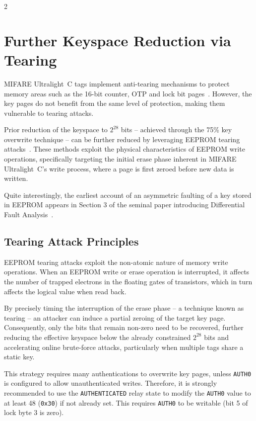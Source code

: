 \documentclass[10pt,letterpaper]{article}
\begin{document}
\begin{multicols}{2}
\section{Further Keyspace Reduction via Tearing}
\label{sec:tear}

MIFARE Ultralight~C tags implement anti-tearing mechanisms to protect memory areas such as the 16-bit counter, OTP and lock bit pages~\cite{nxp_an12265}. However, the key pages do not benefit from the same level of protection, making them vulnerable to tearing attacks.

Prior reduction of the keyspace to $2^{28}$ bits -- achieved through the 75\% key overwrite technique -- can be further reduced by leveraging EEPROM tearing attacks~\cite{teuwen2021eeprom}. These methods exploit the physical characteristics of EEPROM write operations, specifically targeting the initial erase phase inherent in MIFARE Ultralight~C's write process, where a page is first zeroed before new data is written.

Quite interestingly, the earliest account of an asymmetric faulting of a key stored in EEPROM appears in Section 3 of the seminal paper introducing Differential Fault Analysis~\cite{biham_dfa_1997}.

\subsection{Tearing Attack Principles}

EEPROM tearing attacks exploit the non-atomic nature of memory write operations. When an EEPROM write or erase operation is interrupted, it affects the number of trapped electrons in the floating gates of transistors, which in turn affects the logical value when read back. 

By precisely timing the interruption of the erase phase -- a technique known as tearing -- an attacker can induce a partial zeroing of the target key page. Consequently, only the bits that remain non-zero need to be recovered, further reducing the effective keyspace below the already constrained $2^{28}$ bits and accelerating online brute-force attacks, particularly when multiple tags share a static key.

This strategy requires many authentications to overwrite key pages, unless \texttt{AUTH0} is configured to allow unauthenticated writes. Therefore, it is strongly recommended to use the \texttt{AUTHENTICATED} relay state to modify the \texttt{AUTH0} value to at least 48 (\texttt{0x30}) if not already set. This requires \texttt{AUTH0} to be writable (bit 5 of lock byte 3 is zero).


\end{multicols}
\end{document}
